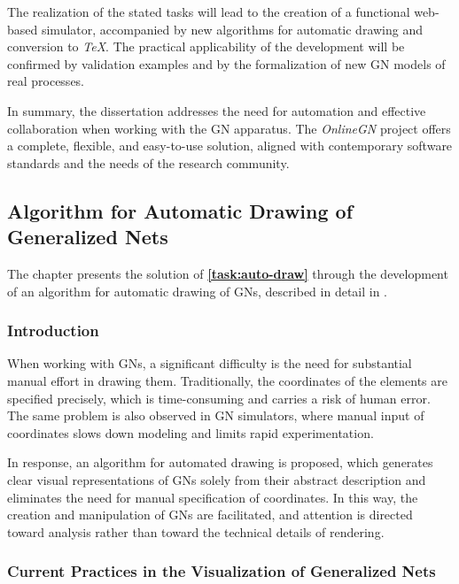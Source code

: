 The realization of the stated tasks will lead to the creation of a functional web-based simulator, accompanied by new algorithms for automatic drawing and conversion to \textit{TeX}. The practical applicability of the development will be confirmed by validation examples and by the formalization of new GN models of real processes.

\vspace{0.5cm}

In summary, the dissertation addresses the need for automation and effective collaboration when working with the GN apparatus. The \textit{OnlineGN} project offers a complete, flexible, and easy-to-use solution, aligned with contemporary software standards and the needs of the research community.



\subsection{Algorithm for Automatic Drawing of Generalized Nets}
\label{sec:auto-drawing}

\hspace*{2.5em}The chapter presents the solution of \textbf{\ref{task:auto-draw}} through the development of an algorithm for automatic drawing of GNs, described in detail in \cite{DIS-DimitrievTerziev}.

\subsubsection{Introduction}
\hspace*{2.5em}When working with GNs, a significant difficulty is the need for substantial manual effort in drawing them. Traditionally, the coordinates of the elements are specified precisely, which is time-consuming and carries a risk of human error. The same problem is also observed in GN simulators, where manual input of coordinates slows down modeling and limits rapid experimentation.

In response, an algorithm for automated drawing is proposed, which generates clear visual representations of GNs solely from their abstract description and eliminates the need for manual specification of coordinates. In this way, the creation and manipulation of GNs are facilitated, and attention is directed toward analysis rather than toward the technical details of rendering.

\subsubsection{Current Practices in the Visualization of Generalized Nets}

